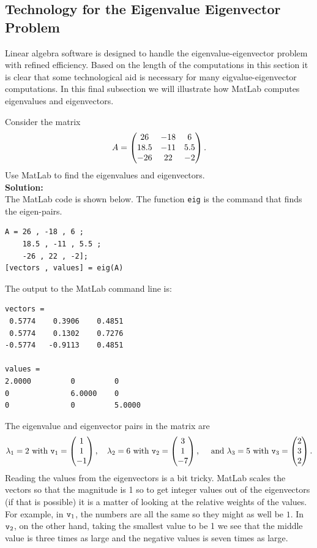  



\subsection{Technology for the Eigenvalue Eigenvector Problem}
Linear algebra software is designed to handle the eigenvalue-eigenvector problem with
refined efficiency.  Based on the length of the computations in this section it is clear
that some technological aid is necessary for many eigvalue-eigenvector computations.  In
this final subsection we will illustrate how MatLab computes eigenvalues and eigenvectors.

\begin{example}
Consider the matrix 
\[ A = \begin{pmatrix} 26  & -18 & 6 \\ 18.5 & -11 & 5.5 \\ -26 & 22 & -2 \end{pmatrix}. \]
Use MatLab to find the eigenvalues and eigenvectors.
\\{\bf Solution:}\\
The MatLab code is shown below.  The function \texttt{eig} is the command that finds the
eigen-pairs.
\begin{verbatim}
A = 26 , -18 , 6 ; 
    18.5 , -11 , 5.5 ;
    -26 , 22 , -2];
[vectors , values] = eig(A)
\end{verbatim}

The output to the MatLab command line is:
\begin{verbatim}
vectors =
 0.5774    0.3906    0.4851
 0.5774    0.1302    0.7276
-0.5774   -0.9113    0.4851

values =
2.0000         0         0
0              6.0000    0
0              0         5.0000
\end{verbatim}

The eigenvalue and eigenvector pairs in the matrix are
\[ \lambda_1 = 2 \text{ with } \texttt{v}_1 = \begin{pmatrix} 1 \\ 1 \\ -1 \end{pmatrix}, \quad \lambda_2 = 6
    \text{ with } \texttt{v}_2 = \begin{pmatrix} 3 \\ 1 \\ -7 \end{pmatrix}, \quad \text{ and } \lambda_3=5 \text{
    with } \texttt{v}_3 = \begin{pmatrix} 2 \\ 3 \\ 2\end{pmatrix}. \]
Reading the values from the eigenvectors is a bit tricky.  MatLab scales the vectors so
that the magnitude is 1 so to get integer values out of the eigenvectors (if that is
possible) it is a matter of looking at the relative weights of the values.  For example,
in $\texttt{v}_1$, the numbers are all the same so they might as well be $1$.  In $\texttt{v}_2$, on the
other hand, taking the smallest value to be 1 we see that the middle value is three times
as large and the negative values is seven times as large.
\end{example}

